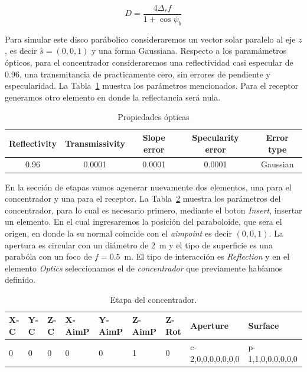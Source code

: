 \begin{equation}
  \label{eq:diametro}
  D = \dfrac{4 \Delta_r f}{1 + \cos \psi_b}
\end{equation}

\ASolution Para simular este disco parábolico consideraremos un vector solar paralelo al eje $z$, es decir $\hat s = (0, 0, 1)$ y una forma Gaussiana. Respecto a los paramámetros ópticos, para el concentrador consideraremos una reflectividad casi especular de 0.96, una transmitancia de practicamente cero, sin errores de pendiente y especularidad. La Tabla~\ref{tab:opticaDisco} muestra los parámetros mencionados. Para el receptor generamos otro elemento en donde la reflectancia será nula.

\begin{table}[h]
  \centering
  \begin{tabular}[h]{ccccc}
    \toprule
    Reflectivity & Transmissivity & Slope error & Specularity error & Error type\\
    \midrule
    0.96         & 0.0001         & 0.0001      & 0.0001            & Gaussian\\
    \bottomrule
  \end{tabular}
  \caption{\label{tab:opticaDisco} Propiedades ópticas}
\end{table}

En la sección de etapas vamos agenerar nuevamente dos elementos, una para el concentrador y una para el receptor. La Tabla~\ref{tab:etapaReceptorD} muestra los parámetros del concentrador, para lo cual es necesario primero, mediante el boton \emph{Insert}, insertar un elemento. En el cual ingresaremos la posición del paraboloide, que sera el origen, en donde la su normal coincide con el \emph{aimpoint} es decir $(0, 0, 1)$. La apertura es circular con un diámetro de 2~m y el tipo de superficie es una parabóla con un foco de $f = 0.5$~m. El tipo de interacción es \emph{Reflection} y en el elemento \emph{Optics} seleccionamos el de \emph{concentrador} que previamente habíamos definido.

\begin{table}[h]
  \centering
  \scriptsize
  \begin{tabular}[h]{lllllllll}
    \toprule
    X-C & Y-C & Z-C & X-AimP & Y-AimP & Z-AimP & Z-Rot & Aperture & Surface\\
    \midrule
    0 & 0 & 0 & 0 & 0 & 1 & 0 & c-2,0,0,0,0,0,0,0 & p-1,1,0,0,0,0,0,0\\
    \bottomrule
  \end{tabular}
  \caption{\label{tab:etapaReceptorD} Etapa del concentrador.}
\end{table}

